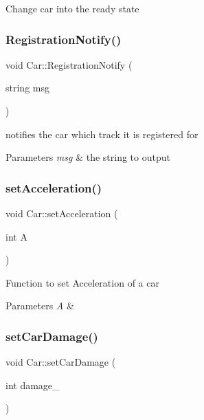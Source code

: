 Change car into the ready state \mbox{\label{class_car_ab8e5fb187d9677c43f65a908f917baa8}} 
\subsubsection{\texorpdfstring{Registration\+Notify()}{RegistrationNotify()}}
{\footnotesize\ttfamily void Car\+::\+Registration\+Notify (\begin{DoxyParamCaption}\item[{string}]{msg }\end{DoxyParamCaption})}

notifies the car which track it is registered for 
\begin{DoxyParams}{Parameters}
{\em msg} & the string to output \\
\hline
\end{DoxyParams}
\mbox{\label{class_car_aa3f0bd8ed0bd0ab70540f1ea9f9c3058}} 
\subsubsection{\texorpdfstring{set\+Acceleration()}{setAcceleration()}}
{\footnotesize\ttfamily void Car\+::set\+Acceleration (\begin{DoxyParamCaption}\item[{int}]{A }\end{DoxyParamCaption})\hspace{0.3cm}{\ttfamily [inline]}}

Function to set Acceleration of a car 
\begin{DoxyParams}{Parameters}
{\em A} & \\
\hline
\end{DoxyParams}
\mbox{\label{class_car_a0b440c163057149751f81da6f50882f3}} 
\subsubsection{\texorpdfstring{set\+Car\+Damage()}{setCarDamage()}}
{\footnotesize\ttfamily void Car\+::set\+Car\+Damage (\begin{DoxyParamCaption}\item[{int}]{damage\+\_\+ }\end{DoxyParamCaption})}


